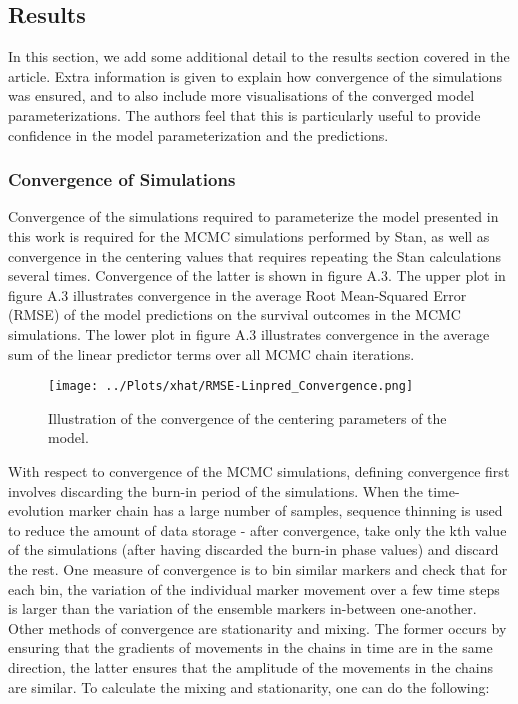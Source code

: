 \documentclass[
]{article}
\begin{document}
\hypertarget{results}{%
\subsection{Results}\label{results}}

In this section, we add some additional detail to the results section
covered in the article. Extra information is given to explain how
convergence of the simulations was ensured, and to also include more
visualisations of the converged model parameterizations. The authors
feel that this is particularly useful to provide confidence in the model
parameterization and the predictions.

\hypertarget{convergence-of-simulations}{%
\subsubsection{Convergence of
Simulations}\label{convergence-of-simulations}}

Convergence of the simulations required to parameterize the model
presented in this work is required for the MCMC simulations performed by
Stan, as well as convergence in the centering values that requires
repeating the Stan calculations several times. Convergence of the latter
is shown in figure A.3. The upper plot in figure A.3 illustrates
convergence in the average Root Mean-Squared Error (RMSE) of the model
predictions on the survival outcomes in the MCMC simulations. The lower
plot in figure A.3 illustrates convergence in the average sum of the
linear predictor terms over all MCMC chain iterations.

\begin{figure}
\centering
\texttt{[image: ../Plots/xhat/RMSE-Linpred\_Convergence.png]}
\caption{Illustration of the convergence of the centering parameters of
the model.}
\end{figure}

With respect to convergence of the MCMC simulations, defining
convergence first involves discarding the burn-in period of the
simulations. When the time-evolution marker chain has a large number of
samples, sequence thinning is used to reduce the amount of data storage
- after convergence, take only the kth value of the simulations (after
having discarded the burn-in phase values) and discard the rest. One
measure of convergence is to bin similar markers and check that for each
bin, the variation of the individual marker movement over a few time
steps is larger than the variation of the ensemble markers in-between
one-another. Other methods of convergence are stationarity and mixing.
The former occurs by ensuring that the gradients of movements in the
chains in time are in the same direction, the latter ensures that the
amplitude of the movements in the chains are similar. To calculate the
mixing and stationarity, one can do the following:
\end{document}
